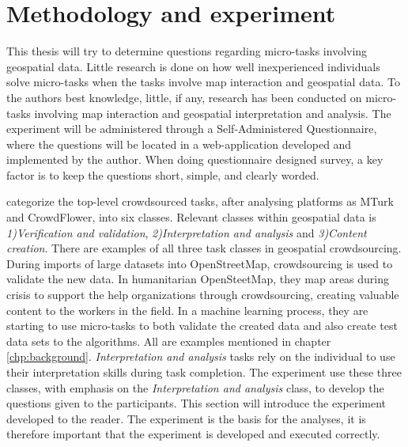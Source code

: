 \chapter{Methodology and experiment}
This thesis will try to determine questions regarding micro-tasks involving geospatial data. Little research is done on how well inexperienced individuals solve micro-tasks when the tasks involve map interaction and geospatial data. To the authors best knowledge, little, if any, research has been conducted on micro-tasks involving map interaction and geospatial interpretation and analysis. The experiment will be administered through a Self-Administered Questionnaire, where the questions will be located in a web-application developed and implemented by the author. When doing questionnaire designed survey, a key factor is to keep the questions short, simple, and clearly worded. 

\cite{Gadiraju2015} categorize the top-level crowdsourced tasks, after analysing platforms as MTurk and CrowdFlower, into six classes. Relevant classes within geospatial data is \textit{1)Verification and validation}, \textit{2)Interpretation and analysis} and \textit{3)Content creation}. There are examples of all three task classes in geospatial crowdsourcing. During imports of large datasets into OpenStreetMap, crowdsourcing is used to validate the new data. In humanitarian OpenSteetMap, they map areas during crisis to support the help organizations through crowdsourcing, creating valuable content to the workers in the field. In a machine learning process, they are starting to use micro-tasks to both validate the created data and also create test data sets to the algorithms. All are examples mentioned in chapter \ref{chp:background}. \textit{Interpretation and analysis} tasks rely on the individual to use their interpretation skills during task completion. The experiment use these three classes, with emphasis on the \textit{Interpretation and analysis} class, to develop the questions given to the participants. This section will introduce the experiment developed to the reader. The experiment is the basis for the analyses, it is therefore important that the experiment is developed and executed correctly.


